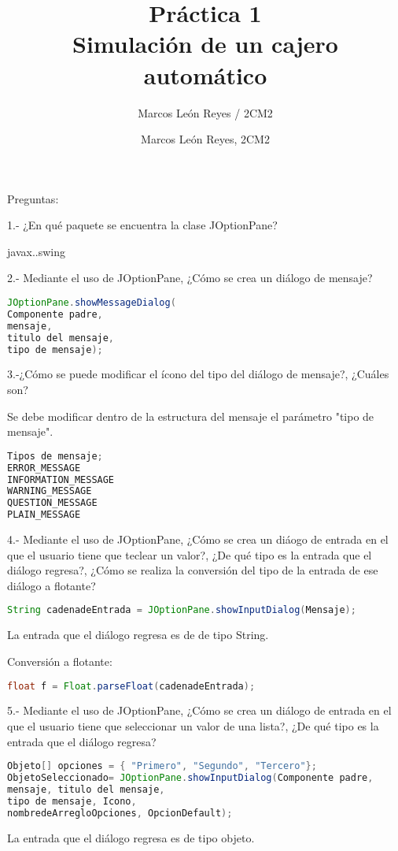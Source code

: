 \documentclass[10pt,a4paper]{article}
\author{Marcos León Reyes / 2CM2}
\begin{document}
\title{Práctica 1\\Simulación de un cajero automático}
\author{Marcos León Reyes, 2CM2}
\date{}
\maketitle

Preguntas:

\vspace{5mm}
1.- ¿En qué paquete se encuentra la clase JOptionPane?

javax..swing

\vspace{5mm}
	
2.- Mediante el uso de JOptionPane, ¿Cómo se crea un diálogo de mensaje?
\begin{lstlisting}[language=Java]
JOptionPane.showMessageDialog(
Componente padre, 
mensaje, 
titulo del mensaje,
tipo de mensaje);
\end{lstlisting}

3.-¿Cómo se puede modificar el ícono del tipo del diálogo de mensaje?, ¿Cuáles son?

Se debe modificar dentro de la estructura del mensaje el parámetro "tipo de mensaje".
\begin{lstlisting}[language=Java]
Tipos de mensaje;
ERROR_MESSAGE
INFORMATION_MESSAGE
WARNING_MESSAGE
QUESTION_MESSAGE
PLAIN_MESSAGE
\end{lstlisting}

4.- Mediante el uso de JOptionPane, ¿Cómo se crea un diáogo de entrada en el que el usuario tiene que teclear un valor?, ¿De qué tipo es la entrada que el diálogo regresa?, ¿Cómo se realiza la conversión  del tipo de la entrada de ese diálogo a flotante?
\begin{lstlisting}[language=Java]
String cadenadeEntrada = JOptionPane.showInputDialog(Mensaje);
\end{lstlisting}

La entrada que el diálogo regresa es de de tipo String.

Conversión a flotante:
\begin{lstlisting}[language=Java]
float f = Float.parseFloat(cadenadeEntrada);
\end{lstlisting}

\vspace{30mm}

5.- Mediante el uso de JOptionPane, ¿Cómo se crea un diálogo de entrada en el que el usuario tiene que seleccionar un valor de una lista?, ¿De qué tipo es la entrada que el diálogo regresa?
\begin{lstlisting}[language=Java]
Objeto[] opciones = { "Primero", "Segundo", "Tercero"};
ObjetoSeleccionado= JOptionPane.showInputDialog(Componente padre,
mensaje, titulo del mensaje,
tipo de mensaje, Icono,
nombredeArregloOpciones, OpcionDefault);
\end{lstlisting}

La entrada que el diálogo regresa es de tipo objeto.
\end{document}

